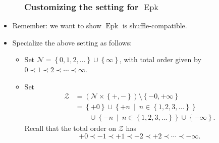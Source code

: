 \documentclass{beamer}
\newcommand{\Epk}{\operatorname{Epk}}
\newcommand{\calN}{\mathcal{N}}
\newcommand{\fti}[1]{\frametitle{\ \ \ \ \ #1}}
\newcommand{\set}[1]{\left\{ #1 \right\}}
\theoremstyle{plain}
\begin{document}
\begin{frame}
\fti{Customizing the setting for $\Epk$}

\begin{itemize}

\item Remember: we want to show $\Epk$ is shuffle-compatible.

\item Specialize the above setting as follows:
\begin{itemize}
\item
      Set $\calN = \set{0, 1, 2, \ldots} \cup \set{\infty}$,
      with total order given by $0\prec1\prec2\prec\cdots \prec\infty$.
\item
      Set
      \begin{align*}
\mathcal{Z}  &  =\left(  \mathcal{N}\times\left\{  +,-\right\}  \right)
\setminus\left\{  -0,+\infty\right\} \\
&  =\left\{  +0\right\}  \cup\left\{  +n\ \mid\ n\in\left\{  1,2,3,\ldots
\right\}  \right\}  \\
& \qquad \cup\left\{  -n\ \mid\ n\in\left\{  1,2,3,\ldots\right\}
\right\}  \cup\left\{  -\infty\right\}  .
\end{align*}
Recall that the total order on $\mathcal{Z}$ has
\[
+0\prec-1\prec+1\prec-2\prec+2\prec\cdots\prec-\infty.
\]
\end{itemize}

\end{itemize}

\end{frame}
\end{document}
